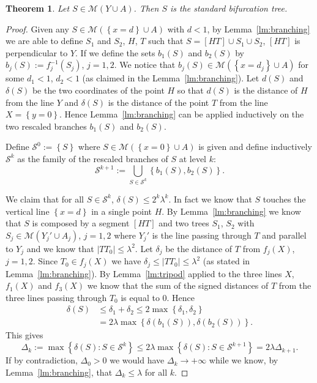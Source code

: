 \documentclass{article}
\newcommand{\abs}[1]{\left\vert #1 \right\vert}
\newcommand{\ENCLOSE}[1]{\left\{#1\right\}}
\newcommand{\M}{\mathcal{M}}
\renewcommand{\S}{\mathcal{S}}
\newtheorem{theorem}{Theorem}[section]
\theoremstyle{definition}
\theoremstyle{remark}
\begin{document}
\begin{theorem}\label{th:main}
Let $S\in \M(Y\cup A)$. 
Then $S$ is the standard bifurcation tree.
\end{theorem}
\begin{proof}
Given any $S\in \M(\ENCLOSE{x=d}\cup A)$ with $d<1$, 
by Lemma~\ref{lm:branching} we are able to define $S_1$ and $S_2$, 
$H$, $T$
 such that 
$S=[H T] \cup S_1 \cup S_2$, $[HT]$ is perpendicular to $Y$.
If we define the sets $b_1(S)$ and $b_2(S)$ 
by $b_j(S) := f_j^{-1}(S_j)$, $j=1,2$.
We notice that $b_j(S)\in \M(\ENCLOSE{x=d_j}\cup A)$ for some $d_1<1$, 
$d_2<1$ (as claimed in the Lemma~\ref{lm:branching}).
Let $d(S)$ and $\delta(S)$ be the two coordinates of the point $H$ 
so that $d(S)$ is the distance of $H$ from the line $Y$ 
and $\delta(S)$ is the distance of the point $T$ from the line $X=\ENCLOSE{y=0}$.
Hence Lemma~\ref{lm:branching} can be applied inductively on the two 
rescaled branches $b_1(S)$ and $b_2(S)$.

Define $\S^0:=\ENCLOSE{S}$ where $S\in \M(\ENCLOSE{x=0}\cup A)$ is given
and define inductively $\S^k$ as the family of the rescaled branches of $S$ 
at level $k$:
\[
  \S^{k+1} := \bigcup_{S\in \S^k}\ENCLOSE{b_1(S),b_2(S)}.
\]

We claim that for all $S\in \S^k$, $\delta(S)\le 2^k \lambda^k$.
In fact we know that $S$ touches the vertical line $\ENCLOSE{x=d}$ 
in a single point $H$.
By Lemma~\ref{lm:branching} we know that $S$ is composed 
by a segment $[H T]$ and two trees $S_1$, $S_2$
with $S_j\in \M(Y_j'\cup A_j)$, $j=1,2$
where $Y_j'$ is the line passing through $T$ and parallel to $Y_j$
and we know that $\abs{T T_0} \le \lambda^2$. 
Let $\delta_j$ be the distance of $T$ from $f_j(X)$, $j=1,2$.
Since $T_0\in f_j(X)$ we have $\delta_j\le \abs{T T_0} \le \lambda^2$
(as stated in Lemma~\ref{lm:branching}).
By Lemma~\ref{lm:tripod} applied to the three lines $X$, $f_1(X)$ and $f_3(X)$
we know that the sum of the signed distances of $T$ from the three lines 
passing through $T_0$ is equal to $0$.
Hence
\begin{align*}
  \delta(S) &\le \delta_1 + \delta_2 
    \le 2\max\ENCLOSE{\delta_1,\delta_2}\\
    &= 2\lambda\max\ENCLOSE{\delta(b_1(S)),\delta(b_2(S))}.
\end{align*}
This gives 
\[
  \Delta_k 
  := \max\ENCLOSE{\delta(S)\colon S\in \S^k}
   \le 2\lambda \max\ENCLOSE{\delta(S)\colon S\in \S^{k+1}}
   = 2 \lambda \Delta_{k+1}.
\]
If by contradiction, $\Delta_0>0$ we would have 
$\Delta_k\to +\infty$ while we know,
by Lemma~\ref{lm:branching}, that $\Delta_k \le \lambda$
for all $k$.
\end{proof}
\end{document}
